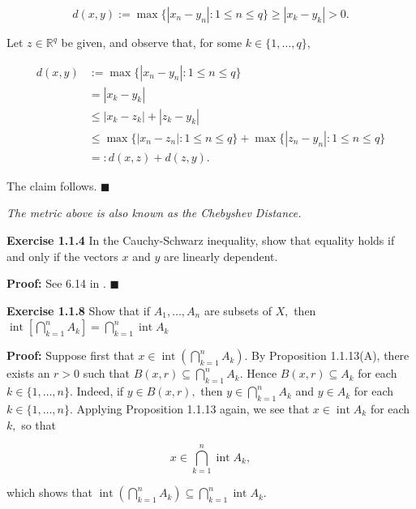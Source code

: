 \documentclass{article}
\DeclareMathOperator{\interior}{int}
\begin{document}
\begin{equation*}
    d(x,y):=\max\{|x_n-y_n|:1\leq n\leq q\}\geq |x_k-y_k|>0.
\end{equation*}

Let $z\in \mathbb{R}^q$ be given, and observe that, for some $k\in \{1,\dots,q\}$, 

\begin{align*}
     d(x,y)&:=\max\{|x_n-y_n|:1\leq n\leq q\}\\
    &=|x_k-y_k|\\
    &\leq |x_k-z_k|+|z_k-y_k|\\
    &\leq \max\{|x_n-z_n|:1\leq n\leq q\}+ \max\{|z_n-y_n|:1\leq n\leq q\}\\
    &=:d(x,z)+d(z,y).
\end{align*}

The claim follows. $\blacksquare$

\begin{tcolorbox}[opacitybacktitle=0.25, colback=yellow!20!white,colframe=blue!70!green,title={Remark:}]
\textit{The metric above is also known as the Chebyshev Distance.}
\end{tcolorbox}
\begin{tcolorbox}
    \textbf{Exercise 1.1.4} In the Cauchy-Schwarz inequality, show that equality holds if and only if the vectors $x$ and $y$ are linearly dependent.
\end{tcolorbox}
\textbf{Proof:} See 6.14 in \cite{Axler}. $\blacksquare$

\begin{tcolorbox}
    \textbf{Exercise 1.1.8} Show that if $A_1,\dots, A_n$ are subsets of $X,$ then $\interior \left[\bigcap_{k=1}^{n}A_k\right]=\bigcap_{k=1}^n \interior A_k$
\end{tcolorbox}

\textbf{Proof:} Suppose first that $x\in \interior  \left(\bigcap_{k=1}^{n}A_k\right)$. By Proposition 1.1.13(A), there exists an $r>0$ such that $B(x,r)\subseteq \bigcap_{k=1}^{n}A_k$. Hence $B(x,r)\subseteq A_k$ for each $k\in \{1,\dots,n\}$. Indeed, if $y\in B(x,r),$ then $y\in \bigcap_{k=1}^{n}A_k$ and $y\in A_k$ for each $k\in \{1,\dots,n\}$. Applying Proposition 1.1.13 again, we see that $x\in \interior A_k$ for each $k,$ so that 

\begin{equation*}
    x\in \bigcap_{k=1}^{n}\interior A_k,
\end{equation*}

which shows that $\interior \left(\bigcap_{k=1}^{n}A_k\right)\subseteq \bigcap_{k=1}^n \interior A_k$.
\end{document}
